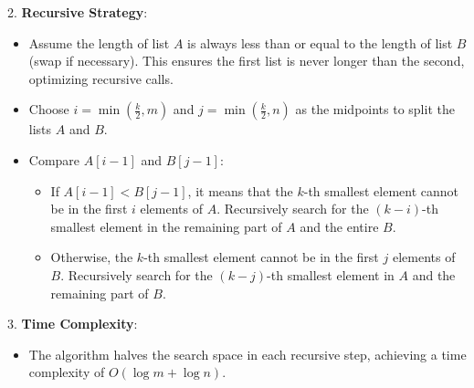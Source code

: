\documentclass{article}
\begin{document}
\begin{itemize}
2. \textbf{Recursive Strategy}:
   \begin{itemize}
       \item Assume the length of list $A$ is always less than or equal to the length of list $B$ (swap if necessary). This ensures the first list is never longer than the second, optimizing recursive calls.
       \item Choose $i = \min(\frac{k}{2}, m)$ and $j = \min(\frac{k}{2}, n)$ as the midpoints to split the lists $A$ and $B$.
       \item Compare $A[i-1]$ and $B[j-1]$:
       \begin{itemize}
           \item If $A[i-1] < B[j-1]$, it means that the $k$-th smallest element cannot be in the first $i$ elements of $A$. Recursively search for the $(k - i)$-th smallest element in the remaining part of $A$ and the entire $B$.
           \item Otherwise, the $k$-th smallest element cannot be in the first $j$ elements of $B$. Recursively search for the $(k - j)$-th smallest element in $A$ and the remaining part of $B$.
       \end{itemize}
   \end{itemize}

3. \textbf{Time Complexity}:
   \begin{itemize}
       \item The algorithm halves the search space in each recursive step, achieving a time complexity of $O(\log m + \log n)$.
   \end{itemize}


\end{itemize}
\end{document}
